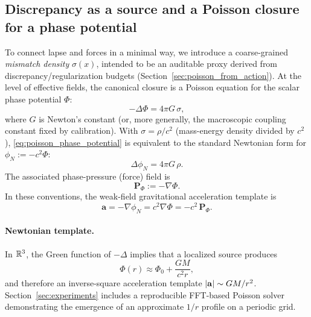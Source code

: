 \subsection{Discrepancy as a source and a Poisson closure for a phase potential}
\label{sec:poisson_closure}

To connect lapse and forces in a minimal way, we introduce a coarse-grained \emph{mismatch density} $\sigma(x)$, intended to be an auditable proxy derived from discrepancy/regularization budgets (Section~\ref{sec:poisson_from_action}).
At the level of effective fields, the canonical closure is a Poisson equation for the scalar phase potential $\Phi$:
\begin{equation}
\label{eq:poisson_phase_potential}
-\Delta \Phi = 4\pi G\,\sigma,
\end{equation}
where $G$ is Newton's constant (or, more generally, the macroscopic coupling constant fixed by calibration).
With $\sigma=\rho/c^2$ (mass-energy density divided by $c^2$), \eqref{eq:poisson_phase_potential} is equivalent to the standard Newtonian form for $\phi_N:=-c^2\Phi$:
\[
\Delta \phi_N = 4\pi G\,\rho.
\]
The associated phase-pressure (force) field is
\begin{equation}
\label{eq:phase_pressure}
\mathbf{P}_\Phi:=-\nabla\Phi.
\end{equation}
In these conventions, the weak-field gravitational acceleration template is
\[
\mathbf{a}=-\nabla\phi_N=c^2\nabla\Phi=-c^2\,\mathbf{P}_\Phi.
\]

\paragraph{Newtonian template.}
In $\mathbb{R}^3$, the Green function of $-\Delta$ implies that a localized source produces
\begin{equation}
\label{eq:one_over_r_potential}
\Phi(r)\approx \Phi_0+\frac{GM}{c^2 r},
\end{equation}
and therefore an inverse-square acceleration template $\left\lvert \mathbf{a}\right\rvert\sim GM/r^2$.
Section~\ref{sec:experiments} includes a reproducible FFT-based Poisson solver demonstrating the emergence of an approximate $1/r$ profile on a periodic grid.

